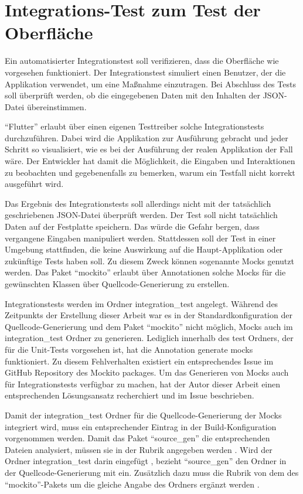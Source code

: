\ifIncludeFigures \clearpage \fi


\section{Integrations-Test zum Test der Oberfläche}


Ein automatisierter Integrationstest soll verifizieren, dass die Oberfläche wie vorgesehen funktioniert.
Der Integrationstest simuliert einen Benutzer, der die Applikation verwendet, um eine Maßnahme einzutragen.
Bei Abschluss des Tests soll überprüft werden, ob die  eingegebenen Daten mit den Inhalten der JSON-Datei übereinstimmen.

\enquote{Flutter} erlaubt über einen eigenen Testtreiber solche Integrationstests durchzuführen.
Dabei wird die Applikation zur Ausführung gebracht und jeder Schritt so visualisiert, wie es bei der Ausführung der realen Applikation der Fall wäre.
Der Entwickler hat damit die Möglichkeit, die Eingaben und Interaktionen zu beobachten und gegebenenfalls zu bemerken, warum ein Testfall nicht korrekt ausgeführt wird.

Das Ergebnis des Integrationstests soll allerdings nicht mit der tatsächlich geschriebenen JSON-Datei überprüft werden.
Der Test soll nicht tatsächlich Daten auf der Festplatte speichern.
Das würde die Gefahr bergen, dass vergangene Eingaben manipuliert werden.
Stattdessen soll der Test in einer Umgebung stattfinden, die keine Auswirkung auf die Haupt-Applikation oder zukünftige Tests haben soll.
Zu diesem Zweck können sogenannte Mocks genutzt werden.
Das Paket \enquote{mockito} erlaubt über Annotationen solche Mocks für die gewünschten Klassen  über Quellcode-Generierung zu erstellen.

Integrationstests werden im Ordner integration_test angelegt.
Während des Zeitpunkts der Erstellung dieser Arbeit war es in der Standardkonfiguration der Quellcode-Generierung und dem Paket \enquote{mockito} nicht möglich, Mocks auch im integration_test Ordner zu generieren.  Lediglich innerhalb des test Ordners, der für die Unit-Tests vorgesehen ist, hat die Annotation generate mocks funktioniert. Zu diesem Fehlverhalten existiert ein entsprechendes Issue im GitHub Repository  des Mockito packages.  Um das Generieren von Mocks auch für Integrationstests verfügbar zu machen, hat der Autor dieser Arbeit einen entsprechenden Lösungsansatz recherchiert und im Issue beschrieben. 

Damit der integration_test Ordner für die Quellcode-Generierung der Mocks integriert wird, muss ein entsprechender Eintrag in der Build-Konfiguration vorgenommen werden.
Damit das Paket \enquote{source_gen} die entsprechenden Dateien analysiert, müssen sie in der Rubrik  angegeben werden .
Wird der Ordner integration_test darin eingefügt , bezieht \enquote{source_gen} den Ordner in der Quellcode-Generierung mit ein.
Zusätzlich dazu muss die Rubrik  von dem  des \enquote{mockito}-Pakets  um die gleiche Angabe des Ordners ergänzt werden .

